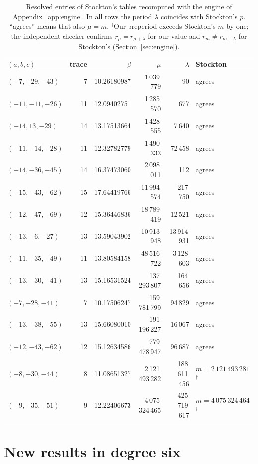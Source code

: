 \documentclass[11pt]{amsart}
\theoremstyle{definition}
\theoremstyle{remark}
\begin{document}
\begin{table}[ht]
\centering\small
\caption{Resolved entries of Stockton's tables recomputed with the engine of Appendix~\ref{app:engine}. In all rows the period $\lambda$ coincides with Stockton's $p$. ``agrees'' means that also $\mu=m$. $^\dagger$Our preperiod exceeds Stockton's $m$ by one; the independent checker confirms $r_\mu=r_{\mu+\lambda}$ for our value and $r_m\neq r_{m+\lambda}$ for Stockton's (Section~\ref{sec:engine}).}\label{tab:validation}
\begin{tabular}{@{}lrrrrl@{}}
\toprule
$(a,b,c)$ & trace & $\beta$ & $\mu$ & $\lambda$ & Stockton\\
\midrule
$(-7,-29,-43)$ & 7 & 10.26180987 & 1\,039\,779 & 90 & agrees\\
$(-11,-11,-26)$ & 11 & 12.09402751 & 1\,285\,570 & 677 & agrees\\
$(-14,13,-29)$ & 14 & 13.17513664 & 1\,428\,555 & 7\,640 & agrees\\
$(-11,-14,-28)$ & 11 & 12.32782779 & 1\,490\,333 & 72\,458 & agrees\\
$(-14,-36,-45)$ & 14 & 16.37473060 & 2\,098\,011 & 112 & agrees\\
$(-15,-43,-62)$ & 15 & 17.64419766 & 11\,994\,574 & 217\,750 & agrees\\
$(-12,-47,-69)$ & 12 & 15.36446836 & 18\,789\,419 & 12\,521 & agrees\\
$(-13,-6,-27)$ & 13 & 13.59043902 & 10\,913\,948 & 13\,914\,931 & agrees\\
$(-11,-35,-49)$ & 11 & 13.80584158 & 48\,516\,722 & 3\,128\,603 & agrees\\
$(-13,-30,-41)$ & 13 & 15.16531524 & 137\,293\,807 & 164\,656 & agrees\\
$(-7,-28,-41)$ & 7 & 10.17506247 & 159\,781\,799 & 94\,829 & agrees\\
$(-13,-38,-55)$ & 13 & 15.66080010 & 191\,196\,227 & 16\,067 & agrees\\
$(-12,-43,-62)$ & 12 & 15.12634586 & 779\,478\,947 & 96\,687 & agrees\\
$(-8,-30,-44)$ & 8 & 11.08651327 & 2\,121\,493\,282 & 188\,611\,456 & $m=2\,121\,493\,281$$^{\dagger}$\\
$(-9,-35,-51)$ & 9 & 12.22406673 & 4\,075\,324\,465 & 425\,719\,617 & $m=4\,075\,324\,464$$^{\dagger}$\\
\bottomrule
\end{tabular}
\end{table}


\section{New results in degree six}\label{sec:new}
\end{document}
